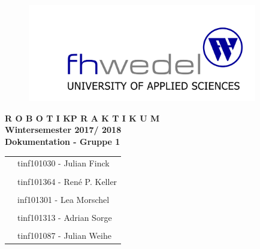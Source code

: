 \documentclass[12pt, a4paper]{scrartcl}
\begin{document}

\begin{center}
	
	\begin{figure}[H]
		\centering
		\includegraphics[width=10cm]{Bilder/fh-wedel-logo.png}
	\end{figure}

	\vspace*{1.5cm}
	\Large{\textbf{ R O B O T I K\quad P R A K T I K U M \\ Wintersemester 2017/ 2018\\}}
	\vspace*{1.5cm}
	\huge{\textbf{Dokumentation - Gruppe 1\\}}
	\vspace*{1.5cm}
	
	\vfill
	\begin{table}[h]\centering
		\begin{tabular}{l l}
			 &  tinf101030 - Julian Finck \\
			 & \\
			 & tinf101364 - René P. Keller  \\
			 & \\
			 & inf101301 - Lea Morschel \\
			 & \\
			 & tinf101313 - Adrian Sorge \\
			 & \\
			 & tinf101087 - Julian Weihe \\
		\end{tabular}
	\end{table}

\end{center}

\thispagestyle{empty} %

\newpage
\tableofcontents %
\thispagestyle{empty} %
\newpage
{}


\end{document}
